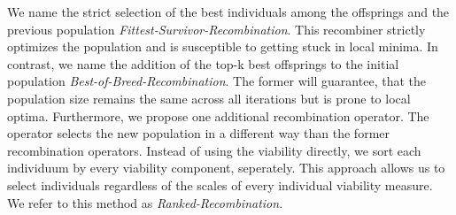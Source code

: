 \documentclass[./../../paper.tex]{subfiles}
\begin{document}
\begin{figure}[htbp]
    \centering
        \label{fig:local-maxima}
\end{figure}





We name the strict selection of the best individuals among the offsprings and the previous population \emph{Fittest-Survivor-Recombination}. This recombiner strictly optimizes the population and is susceptible to getting stuck in local minima. 
In contrast, we name the addition of the top-k best offsprings to the initial population \emph{Best-of-Breed-Recombination}. The former will guarantee, that the population size remains the same across all iterations but is prone to local optima. Furthermore, we propose one additional recombination operator. The operator selects the new population in a different way than the former recombination operators. Instead of using the viability directly, we sort each individuum by every viability component, seperately. This approach allows us to select individuals regardless of the scales of every individual viability measure. We refer to this method as \emph{Ranked-Recombination}. 
\end{document}
